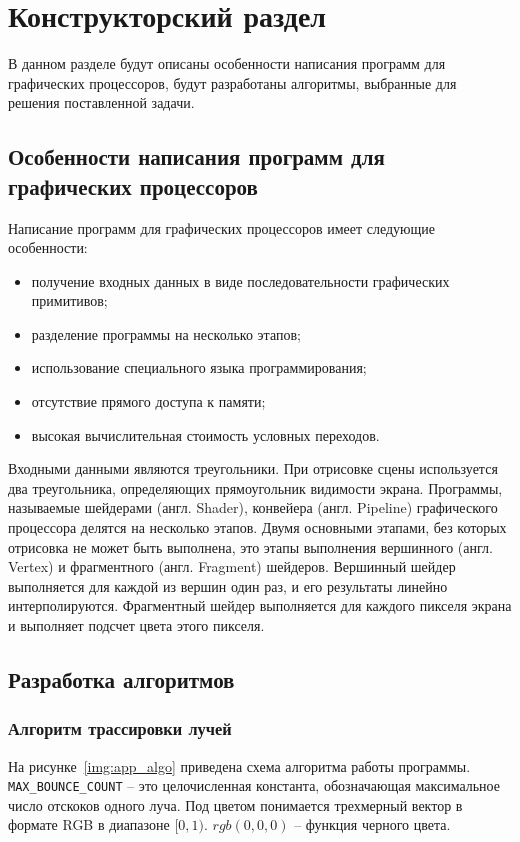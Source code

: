\chapter{Конструкторский раздел}

В данном разделе будут описаны особенности написания программ для графических процессоров, 
будут разработаны алгоритмы, выбранные для решения поставленной задачи.

\section{Особенности написания программ для графических процессоров}

Написание программ для графических процессоров имеет следующие особенности:
\begin{itemize}
    \item получение входных данных в виде последовательности графических примитивов;
    \item разделение программы на несколько этапов;
    \item использование специального языка программирования;
    \item отсутствие прямого доступа к памяти;
    \item высокая вычислительная стоимость условных переходов.
\end{itemize}

Входными данными являются треугольники. При отрисовке сцены используется два треугольника,
определяющих прямоугольник видимости экрана.
Программы, называемые шейдерами (англ. Shader), конвейера (англ. Pipeline) 
графического процессора делятся на несколько этапов. Двумя основными этапами, 
без которых отрисовка не может быть выполнена, это этапы выполнения вершинного (англ. Vertex) и 
фрагментного (англ. Fragment) шейдеров. Вершинный шейдер выполняется для каждой из вершин один
раз, и его результаты линейно интерполируются. Фрагментный шейдер
выполняется для каждого пикселя экрана и выполняет подсчет цвета этого пикселя.

\section{Разработка алгоритмов}

\subsection{Алгоритм трассировки лучей}

На рисунке~\ref{img:app_algo} приведена схема алгоритма работы программы.
\verb|MAX_BOUNCE_COUNT| -- это целочисленная константа, обозначающая максимальное число
отскоков одного луча. Под цветом понимается
трехмерный вектор в формате RGB в диапазоне $[0, 1)$. $rgb(0,0,0)$ -- функция черного цвета. 

